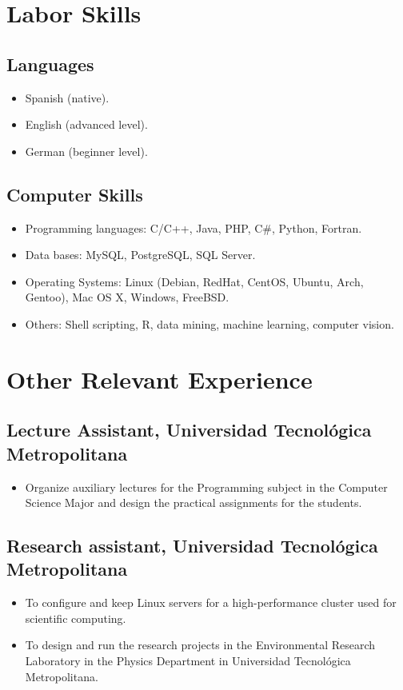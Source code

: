 \documentclass[a4paper,10pt]{article}
\begin{document}
\section*{Labor Skills}
\subsection*{Languages}
\begin{itemize}[leftmargin=*,itemsep=0pt]
  \item Spanish (native).
  \item English (advanced level).
  \item German (beginner level).
\end{itemize}

\subsection*{Computer Skills}
\begin{itemize}[leftmargin=*,itemsep=0pt]
  \item Programming languages: C/C++, Java, PHP, C#, Python, Fortran.
  \item Data bases: MySQL, PostgreSQL, SQL Server.
  \item Operating Systems: Linux (Debian, RedHat, CentOS, Ubuntu, Arch, Gentoo), Mac OS X, Windows, FreeBSD.
  \item Others: Shell scripting, R, data mining, machine learning, computer vision.
\end{itemize}

\section*{Other Relevant Experience}
\subsection*{Lecture Assistant, Universidad Tecnológica Metropolitana}
\begin{itemize}[leftmargin=*,itemsep=0pt]
  \item Organize auxiliary lectures for the Programming subject in the Computer Science Major and design the practical assignments for the students.
\end{itemize}

\subsection*{Research assistant, Universidad Tecnológica Metropolitana}
\begin{itemize}[leftmargin=*,itemsep=0pt]
  \item To configure and keep Linux servers for a high-performance cluster used for scientific computing.
  \item To design and run the research projects in the Environmental Research Laboratory in the Physics Department in Universidad Tecnológica Metropolitana.
\end{itemize}
\end{document}
